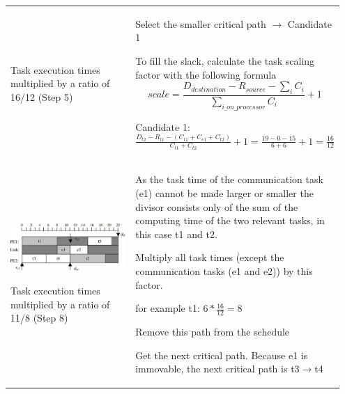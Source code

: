 \begin{longtable}{p{0.4\linewidth}p{0.55\linewidth}}
				Task execution times multiplied by a ratio of 16/12 (Step 5)			
			&
				\begin{compactenum}	
					\setcounter{enumi}{2}
					\item Select the smaller critical path $\rightarrow$ Candidate 1
					\item To fill the slack, calculate the task scaling factor with the following formula 
					\begin{equation*}
						scale=\frac{D_{destination}-R_{source}-\sum_{i}C_i}{\sum_{i\_on\_processor}C_i}+1
					\end{equation*}
					\begin{compactitem}
						\item Candidate 1: $\frac{D_{t2}-R_{t1}-(C_{t1}+C_{e1}+C_{t2})}{C_{t1}+C_{t2}}+1=\frac{19-0-15}{6+6}+1=\frac{16}{12}$
					\end{compactitem}				
				\end{compactenum}\\				
				
			\vspace{0pt}
			
			\includegraphics[scale=0.35]{./pictures/voltage_scheduling_3.png}
			
			Task execution times multiplied by a ratio of 11/8 (Step 8)			
			&
				\begin{compactenum}[\ ]
					\item As the task time of the communication task (e1) cannot be made larger or smaller the divisor consists only of the sum of the computing time of the two relevant tasks, in this case t1 and t2.
				\end{compactenum}
				\begin{compactenum}	
					\setcounter{enumi}{4}
					\item Multiply all task times (except the communication tasks (e1 and e2)) by this factor.
					\begin{compactitem}
						\item for example t1: $6*\frac{16}{12}=8$
					\end{compactitem}
					\item Remove this path from the schedule
					\item Get the next critical path. Because e1 is immovable, the next critical path is t3$\rightarrow$t4								
				\end{compactenum}	\\
			

\end{longtable}
